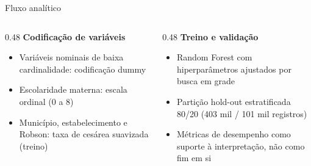 \documentclass[aspectratio=169,xcolor=table]{beamer}
\begin{document}
\begin{frame}{Fluxo analítico}
    \begin{center}
    \end{center}

    \vspace{0.5em}
    \begin{columns}[T]
        \begin{column}{0.48\textwidth}
            \textbf{Codificação de variáveis}
            \begin{itemize}
                \item Variáveis nominais de baixa cardinalidade: codificação dummy
                \item Escolaridade materna: escala ordinal (0 a 8)
                \item Município, estabelecimento e Robson: taxa de cesárea suavizada (treino)
            \end{itemize}
        \end{column}
        \begin{column}{0.48\textwidth}
            \textbf{Treino e validação}
            \begin{itemize}
                \item Random Forest com hiperparâmetros ajustados por busca em grade
                \item Partição hold-out estratificada 80/20 (403 mil / 101 mil registros)
                \item Métricas de desempenho como suporte à interpretação, não como fim em si
            \end{itemize}
        \end{column}
    \end{columns}
\end{frame}
\end{document}

